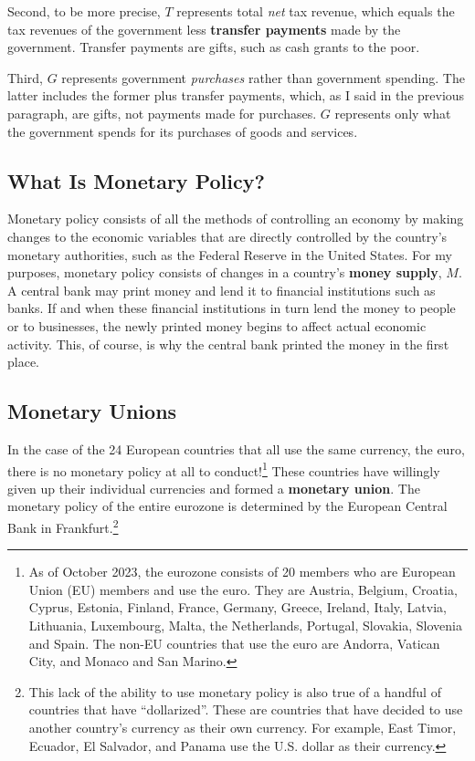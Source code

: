 \documentclass[
  letterpaper,
]{book}
\theoremstyle{plain}
\theoremstyle{remark}
\begin{document}
Second, to be more precise, \(T\) represents total \emph{net} tax
revenue, which equals the tax revenues of the government less
\textbf{transfer payments} made by the government. Transfer payments are
gifts, such as cash grants to the poor.

Third, \(G\) represents government \emph{purchases} rather than
government spending. The latter includes the former plus transfer
payments, which, as I said in the previous paragraph, are gifts, not
payments made for purchases. \(G\) represents only what the government
spends for its purchases of goods and services.

\subsection{What Is Monetary Policy?}\label{sec-monetary}

Monetary policy consists of all the
methods of controlling an economy by making changes to the economic
variables that are directly controlled by the country's monetary
authorities, such as the Federal Reserve in the United States. For my
purposes, monetary policy consists of changes in a country's
\textbf{money supply}, \(M\). A central bank may print money and lend it
to financial institutions such as banks. If and when these financial
institutions in turn lend the money to people or to businesses, the
newly printed money begins to affect actual economic activity. This, of
course, is why the central bank printed the money in the first place.

\subsection{Monetary Unions}\label{sec-monetary-unions}

In the case of the 24 European countries that all use the same currency,
the euro, there is no monetary policy at all to conduct!\footnote{As of
  October 2023, the eurozone consists of 20 members who are European
  Union (EU) members and use the euro. They are Austria, Belgium,
  Croatia, Cyprus, Estonia, Finland, France, Germany, Greece, Ireland,
  Italy, Latvia, Lithuania, Luxembourg, Malta, the Netherlands,
  Portugal, Slovakia, Slovenia and Spain. The non-EU countries that use
  the euro are Andorra, Vatican City, and Monaco and San Marino.} These
countries have willingly given up their individual currencies and formed
a \textbf{monetary union}. The monetary
policy of the entire eurozone is determined by the European Central
Bank in Frankfurt.\footnote{This
  lack of the ability to use monetary policy is also true of a handful
  of countries that have ``dollarized''. These are
  countries that have decided to use another country's currency as their
  own currency. For example, East Timor, Ecuador, El Salvador, and
  Panama use the U.S. dollar as their currency.}
\end{document}
